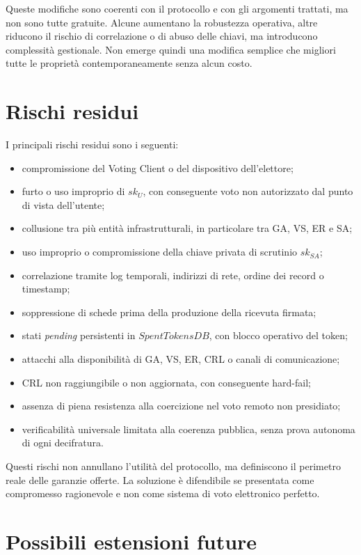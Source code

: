\documentclass[a4paper,12pt]{article}
\begin{document}
Queste modifiche sono coerenti con il protocollo e con gli argomenti trattati, ma non sono tutte gratuite. Alcune aumentano la robustezza operativa, altre riducono il rischio di correlazione o di abuso delle chiavi, ma introducono complessità gestionale. Non emerge quindi una modifica semplice che migliori tutte le proprietà contemporaneamente senza alcun costo.

\section{Rischi residui}

I principali rischi residui sono i seguenti:

\begin{itemize}
    \item compromissione del Voting Client o del dispositivo dell'elettore;
    \item furto o uso improprio di \(sk_U\), con conseguente voto non autorizzato dal punto di vista dell'utente;
    \item collusione tra più entità infrastrutturali, in particolare tra GA, VS, ER e SA;
    \item uso improprio o compromissione della chiave privata di scrutinio \(sk_{SA}\);
    \item correlazione tramite log temporali, indirizzi di rete, ordine dei record o timestamp;
    \item soppressione di schede prima della produzione della ricevuta firmata;
    \item stati \emph{pending} persistenti in \(SpentTokensDB\), con blocco operativo del token;
    \item attacchi alla disponibilità di GA, VS, ER, CRL o canali di comunicazione;
    \item CRL non raggiungibile o non aggiornata, con conseguente hard-fail;
    \item assenza di piena resistenza alla coercizione nel voto remoto non presidiato;
    \item verificabilità universale limitata alla coerenza pubblica, senza prova autonoma di ogni decifratura.
\end{itemize}

Questi rischi non annullano l'utilità del protocollo, ma definiscono il perimetro reale delle garanzie offerte.
La soluzione è difendibile se presentata come compromesso ragionevole e non come sistema di voto elettronico perfetto.

\section{Possibili estensioni future}
\end{document}
